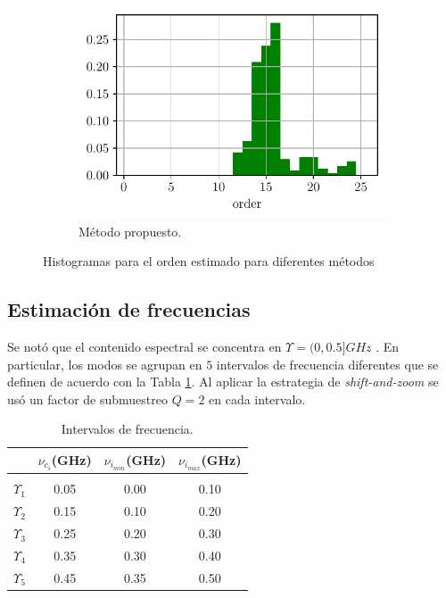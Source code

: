 \begin{figure}
\begin{subfigure}{0.3\linewidth}
                \includegraphics[width = \linewidth]{Figuras/orden_mio_UWB.pdf}
                \caption{Método propuesto.}
            \end{subfigure}
            \caption{Histogramas para el orden estimado para diferentes métodos}
            \label{fig:enter-label}
        \end{figure}

        
    \subsection{Estimación de frecuencias}
	Se notó que el contenido espectral se concentra en $\Upsilon = (0,0.5] GHz$ . En particular, los modos se agrupan en  $5$ intervalos de frecuencia diferentes que se definen de acuerdo con la Tabla \ref{Table:segments}. Al aplicar la estrategia de \emph{shift-and-zoom} se usó un factor de submuestreo $Q = 2$ en cada intervalo.

	\begin{table}[ht]
		\centering
		\caption{Intervalos de frecuencia.\label{Table:segments}}
		{\begin{tabular*}{20pc}{@{\extracolsep{\fill}}cccc@{}}
				& $\nu_{c_i}$(GHz)       & $\nu_{i_{min}}$(GHz)      & $\nu_{i_{max}}$(GHz) \\ \hline \\[-0.9em] 
				
				$\Upsilon_1$   & 0.05 & 0.00 & 0.10  \\ 
				$\Upsilon_2$   & 0.15 & 0.10 & 0.20  \\ 
				$\Upsilon_3$   & 0.25 & 0.20 & 0.30 \\ 
				$\Upsilon_4$   & 0.35 & 0.30 & 0.40   \\ 
				$\Upsilon_5$   & 0.45 & 0.35 & 0.50   \\ \hline	
		\end{tabular*}}{}
	\end{table}

